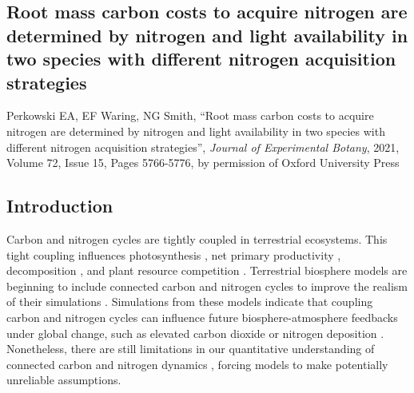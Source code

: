 \begin{singlespace}
\chapter{\textbf{Root mass carbon costs to acquire nitrogen are determined by nitrogen and light availability in two species with different nitrogen acquisition strategies}}
\end{singlespace}

\begin{singlespace}
    \noindent Perkowski EA, EF Waring, NG Smith, ``Root mass carbon costs to acquire nitrogen are determined by nitrogen and light availability in two species with different nitrogen acquisition strategies'', \textit{Journal of Experimental Botany}, 2021, Volume 72, Issue 15, Pages 5766-5776, by permission of Oxford University Press
\end{singlespace}

\bigskip
\section{Introduction}
\noindent Carbon and nitrogen cycles are tightly coupled in terrestrial ecosystems. This tight coupling influences photosynthesis , net primary productivity , decomposition , and plant resource competition . Terrestrial biosphere models are beginning to include connected carbon and nitrogen cycles to improve the realism of their simulations . Simulations from these models indicate that coupling carbon and nitrogen cycles can influence future biosphere-atmosphere feedbacks under global change, such as elevated carbon dioxide or nitrogen deposition . Nonetheless, there are still limitations in our quantitative understanding of connected carbon and nitrogen dynamics , forcing models to make potentially unreliable assumptions.

